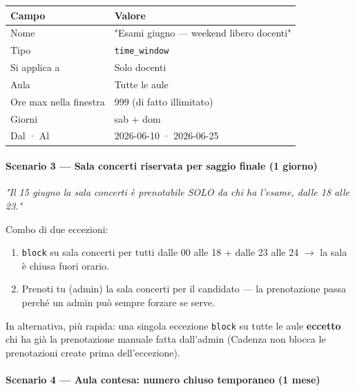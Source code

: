 \documentclass[11pt,a4paper]{article}
\renewenvironment{quote}
  {\begin{list}{}{%
      \setlength{\leftmargin}{8pt}%
      \setlength{\rightmargin}{8pt}%
      \setlength{\topsep}{6pt}%
      \setlength{\parsep}{0pt}}%
      \item\relax\color{black!75}\itshape}
  {\end{list}}
\begin{document}
\begin{table}[H]
\centering
\small
\begin{tabularx}{\linewidth}{|X|X|}
\hline
\rowcolor{tableheader} Campo & Valore \\
\hline
Nome & "Esami giugno --- weekend libero docenti" \\
\hline
Tipo & \texttt{time\_window} \\
\hline
Si applica a & Solo docenti \\
\hline
Aula & Tutte le aule \\
\hline
Ore max nella finestra & 999 (di fatto illimitato) \\
\hline
Giorni & sab + dom \\
\hline
Dal · Al & 2026-06-10 · 2026-06-25 \\
\hline
\end{tabularx}
\end{table}


\paragraph{Scenario 3 --- Sala concerti riservata per saggio finale (1 giorno)}


\begin{quote}
\textit{"Il 15 giugno la sala concerti è prenotabile SOLO da chi ha l'esame, dalle 18 alle 23."}
\end{quote}

Combo di due eccezioni:

\begin{enumerate}
  \item \texttt{block} su sala concerti per tutti dalle 00 alle 18 + dalle 23 alle 24 $\rightarrow$ la sala è chiusa fuori orario.
  \item Prenoti tu (admin) la sala concerti per il candidato --- la prenotazione passa perché un admin può sempre forzare se serve.
\end{enumerate}

In alternativa, più rapida: una singola eccezione \texttt{block} su tutte le aule \textbf{eccetto} chi ha già la prenotazione manuale fatta dall'admin (Cadenza non blocca le prenotazioni create prima dell'eccezione).

\paragraph{Scenario 4 --- Aula contesa: numero chiuso temporaneo (1 mese)}
\end{document}
